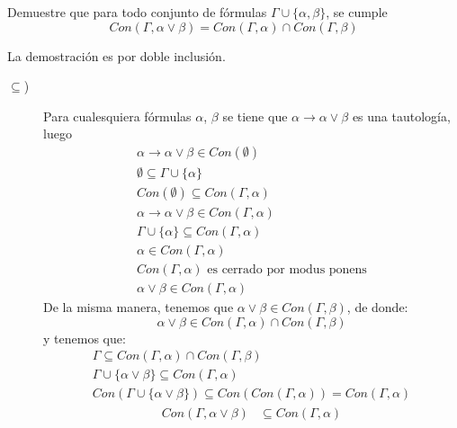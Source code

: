 \begin{ejercicio}
    Demuestre que para todo conjunto de fórmulas $\Gamma\cup\{\alpha,\beta\}$, se cumple
    \begin{equation*}
        Con(\Gamma,\alpha\lor\beta) = Con(\Gamma,\alpha) \cap Con(\Gamma,\beta)
    \end{equation*}

    La demostración es por doble inclusión.
    \begin{description}
        \item [$\subseteq$)] 
            Para cualesquiera fórmulas $\alpha$, $\beta$ se tiene que $\alpha\rightarrow\alpha\lor\beta$ es una tautología, luego 
                \begin{gather*}
                    \alpha\rightarrow\alpha\lor\beta\in Con(\emptyset ) \\
                    \emptyset \subseteq \Gamma\cup\{\alpha\} \\
                    Con(\emptyset )\subseteq Con(\Gamma,\alpha) \\
                    \alpha\rightarrow\alpha\lor\beta\in Con(\Gamma,\alpha) \\
                    \Gamma\cup\{\alpha\}\subseteq Con(\Gamma,\alpha)\\
                    \alpha\in Con(\Gamma,\alpha) \\
                    Con(\Gamma,\alpha) \text{\ es\ cerrado\ por\ modus\ ponens} \\
                    \alpha\lor\beta\in Con(\Gamma,\alpha)
                \end{gather*}
                De la misma manera, tenemos que $\alpha\lor\beta\in Con(\Gamma,\beta)$, de donde:
                \begin{equation*}
                    \alpha\lor\beta\in Con(\Gamma,\alpha)\cap Con(\Gamma,\beta)
                \end{equation*}
                y tenemos que:
                \begin{gather*}
                    \Gamma\subseteq Con(\Gamma,\alpha)\cap Con(\Gamma,\beta) \\
                    \Gamma\cup\{\alpha\lor\beta\} \subseteq Con(\Gamma,\alpha) \\
                    Con(\Gamma\cup\{\alpha\lor\beta\}) \subseteq Con(Con(\Gamma,\alpha)) = Con(\Gamma,\alpha)
                \end{gather*}
                \begin{align*}
                    Con(\Gamma,\alpha\lor\beta) &\subseteq Con(\Gamma,\alpha) \\

\end{align*}
\end{description}
\end{ejercicio}
